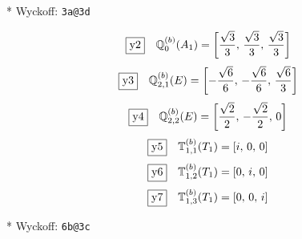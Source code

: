 \documentclass[fleqn,10pt,landscape]{jsarticle}
\begin{document}
\vspace{5mm}

\noindent ** Wyckoff: \texttt{3a@3d}

\begin{dmath*}
\fbox{y2}\quad \mathbb{Q}_{0}^{(b)}(A_{1})=\left[ \frac{\sqrt{3}}{3},\, \frac{\sqrt{3}}{3},\, \frac{\sqrt{3}}{3} \right]
\end{dmath*}
\begin{dmath*}
\fbox{y3}\quad \mathbb{Q}_{2,1}^{(b)}(E)=\left[ - \frac{\sqrt{6}}{6},\, - \frac{\sqrt{6}}{6},\, \frac{\sqrt{6}}{3} \right]
\end{dmath*}
\begin{dmath*}
\fbox{y4}\quad \mathbb{Q}_{2,2}^{(b)}(E)=\left[ \frac{\sqrt{2}}{2},\, - \frac{\sqrt{2}}{2},\, 0 \right]
\end{dmath*}
\begin{dmath*}
\fbox{y5}\quad \mathbb{T}_{1,1}^{(b)}(T_{1})=\left[ i,\, 0,\, 0 \right]
\end{dmath*}
\begin{dmath*}
\fbox{y6}\quad \mathbb{T}_{1,2}^{(b)}(T_{1})=\left[ 0,\, i,\, 0 \right]
\end{dmath*}
\begin{dmath*}
\fbox{y7}\quad \mathbb{T}_{1,3}^{(b)}(T_{1})=\left[ 0,\, 0,\, i \right]
\end{dmath*}
\vspace{5mm}

\noindent ** Wyckoff: \texttt{6b@3c}
\end{document}
